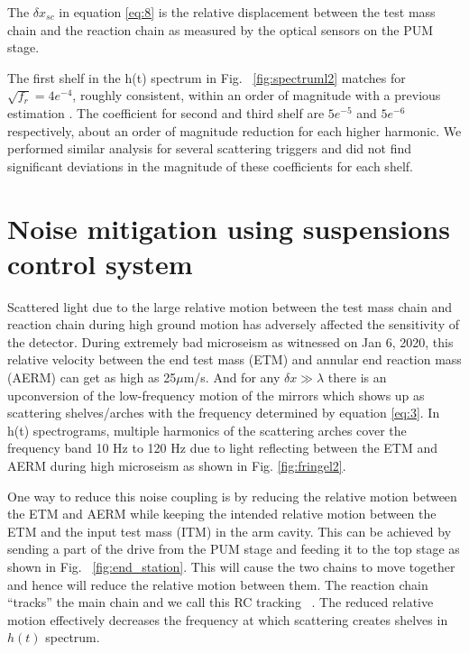 \documentclass[12pt]{iopart}
\begin{document}
The $\delta x_{sc} $ in equation \ref{eq:8} is the relative displacement between the test mass chain and the reaction chain as measured by the optical sensors on the PUM stage. 

The first shelf in the h(t) spectrum in Fig. ~\ref{fig:spectruml2} matches for $\sqrt{f_{r}} = 4e^{-4}$, roughly consistent, within an order of magnitude with a previous estimation \cite{hiro_calc}. The coefficient for second and third shelf are $5e^{-5}$ and $5e^{-6}$ respectively, about an order of magnitude reduction for each higher harmonic. We performed similar analysis for several scattering triggers and did not find significant deviations in the magnitude of these coefficients for each shelf.
\qquad



\section{Noise mitigation using suspensions control system} \label{rzero}

Scattered light due to the large relative motion between the test mass chain and reaction chain during high ground motion has adversely affected the sensitivity of the detector. 
During extremely bad microseism as witnessed on Jan 6, 2020, this relative velocity between the end test mass (ETM) and annular end reaction mass (AERM) can get as high as 25${\mu}$m/s. And for any ${\delta}x \gg {\lambda}$ there is an upconversion of the low-frequency motion of the mirrors which shows up as scattering shelves/arches with the frequency determined by equation \ref{eq:3}. In h(t) spectrograms, multiple harmonics of the scattering arches cover the frequency band 10 Hz to 120 Hz due to light reflecting between the ETM and AERM during high microseism as shown in Fig. \ref{fig:fringel2}.

One way to reduce this noise coupling is by reducing the relative motion between the ETM and AERM while keeping the intended relative motion between the ETM and the input test mass (ITM) in the arm cavity. This can be achieved by sending a part of the drive from the PUM stage and feeding it to the top stage as shown in Fig. ~\ref{fig:end_station}. This will cause the two chains to move together and hence will reduce the relative motion between them. The reaction chain ``tracks'' the main chain and we call this RC tracking ~\cite{alog_robert}.
The reduced relative motion effectively decreases the frequency at which scattering creates shelves in $h(t)$ spectrum. 
\end{document}
